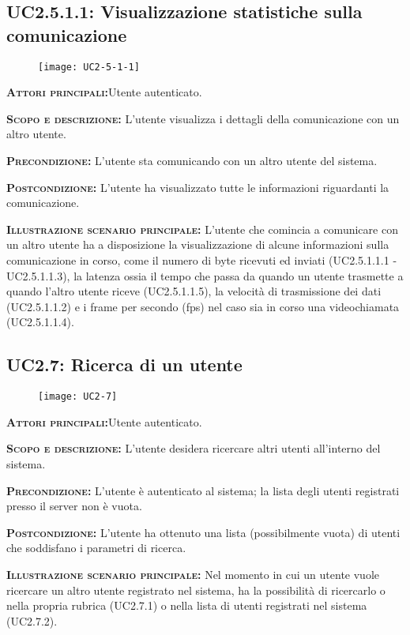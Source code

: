 \subsection{UC2.5.1.1: Visualizzazione statistiche sulla comunicazione}
\begin{figure}[H]
\begin{center}
\texttt{[image: UC2-5-1-1]}
\caption{}\label{fig:}
\end{center}
\end{figure}
\begin{description}
\item{\scshape\bfseries Attori principali:}Utente autenticato.
\item{\scshape\bfseries Scopo e descrizione:} L'utente visualizza i dettagli della comunicazione con un altro utente.
\item{\scshape\bfseries Precondizione:} L'utente sta comunicando con un altro utente del sistema.
\item{\scshape\bfseries Postcondizione:} L'utente ha visualizzato tutte le informazioni riguardanti la comunicazione.
\item{\scshape\bfseries Illustrazione scenario principale:} L'utente che comincia a comunicare con un altro utente ha a disposizione la visualizzazione di alcune informazioni sulla comunicazione in corso, come il numero di byte ricevuti ed inviati (UC2.5.1.1.1 - UC2.5.1.1.3), la latenza ossia il tempo che passa da quando un utente trasmette a quando l'altro utente riceve (UC2.5.1.1.5), la velocità di trasmissione dei dati (UC2.5.1.1.2) e i frame per secondo (fps) nel caso sia in corso una videochiamata (UC2.5.1.1.4).
\end{description}

\subsection{UC2.7: Ricerca di un utente}
\begin{figure}[H]
\begin{center}
\texttt{[image: UC2-7]}
\caption{}\label{fig:}
\end{center}
\end{figure}
\begin{description}
\item{\scshape\bfseries Attori principali:}Utente autenticato.
\item{\scshape\bfseries Scopo e descrizione:} L'utente desidera ricercare altri utenti all'interno del sistema.
\item{\scshape\bfseries Precondizione:} L'utente è autenticato al sistema; la lista degli utenti registrati presso il server non è vuota.
\item{\scshape\bfseries Postcondizione:} L'utente ha ottenuto una lista (possibilmente vuota) di utenti che soddisfano i parametri di ricerca.
\item{\scshape\bfseries Illustrazione scenario principale:} Nel momento in cui un utente vuole ricercare un altro utente registrato nel sistema, ha la possibilità  di ricercarlo o nella propria rubrica (UC2.7.1) o nella lista di utenti registrati nel sistema (UC2.7.2).
\end{description}

